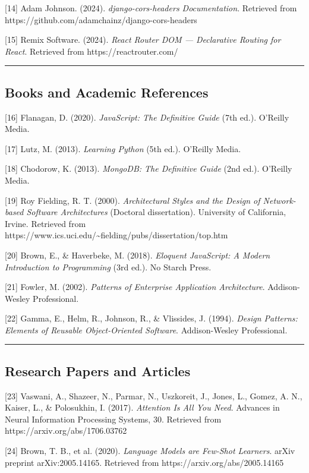 \documentclass[12pt]{article}
\begin{document}
[14] Adam Johnson. (2024). \textit{django-cors-headers Documentation}. Retrieved from https://github.com/adamchainz/django-cors-headers

[15] Remix Software. (2024). \textit{React Router DOM — Declarative Routing for React}. Retrieved from https://reactrouter.com/

\noindent\rule{\textwidth}{0.4pt}

\subsection{Books and Academic References}

[16] Flanagan, D. (2020). \textit{JavaScript: The Definitive Guide} (7th ed.). O'Reilly Media.

[17] Lutz, M. (2013). \textit{Learning Python} (5th ed.). O'Reilly Media.

[18] Chodorow, K. (2013). \textit{MongoDB: The Definitive Guide} (2nd ed.). O'Reilly Media.

[19] Roy Fielding, R. T. (2000). \textit{Architectural Styles and the Design of Network-based Software Architectures} (Doctoral dissertation). University of California, Irvine. Retrieved from https://www.ics.uci.edu/\textasciitilde{}fielding/pubs/dissertation/top.htm

[20] Brown, E., \& Haverbeke, M. (2018). \textit{Eloquent JavaScript: A Modern Introduction to Programming} (3rd ed.). No Starch Press.

[21] Fowler, M. (2002). \textit{Patterns of Enterprise Application Architecture}. Addison-Wesley Professional.

[22] Gamma, E., Helm, R., Johnson, R., \& Vlissides, J. (1994). \textit{Design Patterns: Elements of Reusable Object-Oriented Software}. Addison-Wesley Professional.

\noindent\rule{\textwidth}{0.4pt}

\subsection{Research Papers and Articles}

[23] Vaswani, A., Shazeer, N., Parmar, N., Uszkoreit, J., Jones, L., Gomez, A. N., Kaiser, L., \& Polosukhin, I. (2017). \textit{Attention Is All You Need}. Advances in Neural Information Processing Systems, 30. Retrieved from https://arxiv.org/abs/1706.03762

[24] Brown, T. B., et al. (2020). \textit{Language Models are Few-Shot Learners}. arXiv preprint arXiv:2005.14165. Retrieved from https://arxiv.org/abs/2005.14165
\end{document}
